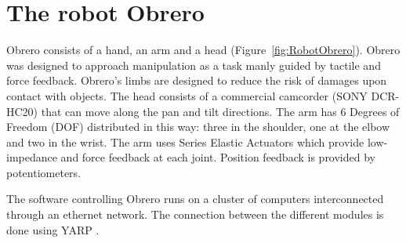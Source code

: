\section{The robot Obrero}
\label{sec:platform}
%
Obrero \cite{obrero} consists of a hand, an arm and a head
(Figure~\ref{fig:RobotObrero}). Obrero was designed to approach
manipulation as a task manly guided by tactile and force feedback.
Obrero's limbs are designed to
reduce the risk of damages upon contact with objects.
The head consists of a
commercial camcorder (SONY DCR-HC20) that can move along the pan
and tilt directions. The arm has 6 Degrees of Freedom (DOF)
distributed in this way: three in the shoulder, one at the elbow
and two in the wrist. The arm \cite{AaronArm} uses Series Elastic
Actuators \cite{williamson95series} which provide low-impedance
and force feedback at each joint. Position feedback is provided by
potentiometers.

The software controlling Obrero runs on a cluster of computers
interconnected through an ethernet network. The connection between
the different modules is done using YARP \cite{yarpPaper}.
%
